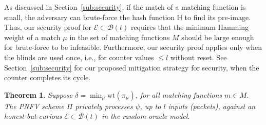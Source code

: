 \RequirePackage{fix-cm} \let\oldvec\vec \documentclass{sig-alternate-05-2015}
\newtheorem{theorem}{Theorem}
\begin{document}
As discussed in Section~\ref{sub:security}, if the match of a matching function is small, the adversary can brute-force the hash function $\mathbb{H}$ to find its pre-image. Thus, our security proof for $\mathcal{E} \subset \mathcal{B}(t)$ requires that the minimum Hamming weight of a match $\mu$ in the set of matching functions $M$ should be large enough for brute-force to be infeasible. Furthermore, our security proof applies only when the blinds are used once, i.e., for counter values $\le l$ without reset. See Section~\ref{sub:security} for our proposed mitigation strategy for security, when the counter completes its cycle.
\begin{theorem}
Suppose $\delta = \min_\mu \text{wt}(\pi_\mu)$, for all matching functions $m \in M$. The PNFV scheme $\Pi$ privately processes $\psi$, up to $l$ inputs (packets), against an honest-but-curious $\mathcal{E} \subset \mathcal{B}(t)$ in the random oracle model.
\end{theorem}
\end{document}
